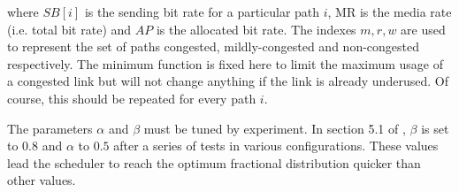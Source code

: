 where $SB[i]$ is the sending bit rate for a particular path $i$, MR is the media rate (i.e. total bit rate) and $AP$ is the allocated bit rate. The indexes $m,r,w$ are used to represent the set of paths congested, mildly-congested and non-congested respectively. The minimum function is fixed here to limit the maximum usage of a congested link but will not change anything if the link is already underused. Of course, this should be repeated for every path $i$.

The parameters $\alpha$ and $\beta$ must be tuned by experiment. In section 5.1 of \cite{singh2013mprtp}, $\beta$ is set to $0.8$ and $\alpha$ to $0.5$ after a series of tests in various configurations. These values lead the scheduler to reach the optimum fractional distribution quicker than other values.